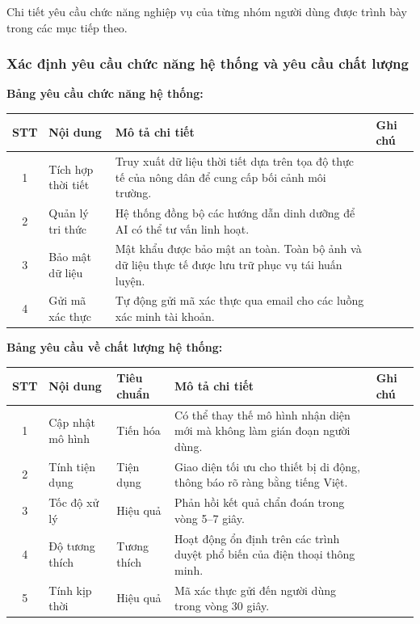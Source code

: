 \documentclass[12pt,a4paper]{article}
\begin{document}
Chi tiết yêu cầu chức năng nghiệp vụ của từng nhóm người dùng được trình bày trong các mục tiếp theo.

\subsubsection{Xác định yêu cầu chức năng hệ thống và yêu cầu chất lượng}

\textbf{Bảng yêu cầu chức năng hệ thống:}
\begin{longtable}{|c|l|p{9.5cm}|l|}
    \hline
    \rowcolor{headerblue}
    \textbf{STT} & \textbf{Nội dung}  & \textbf{Mô tả chi tiết}                                                                            & \textbf{Ghi chú} \\
    \hline
    \endhead
    1            & Tích hợp thời tiết & Truy xuất dữ liệu thời tiết dựa trên tọa độ thực tế của nông dân để cung cấp bối cảnh môi trường.  &                  \\
    \hline
    2            & Quản lý tri thức   & Hệ thống đồng bộ các hướng dẫn dinh dưỡng để AI có thể tư vấn linh hoạt.                           &                  \\
    \hline
    3            & Bảo mật dữ liệu    & Mật khẩu được bảo mật an toàn. Toàn bộ ảnh và dữ liệu thực tế được lưu trữ phục vụ tái huấn luyện. &                  \\
    \hline
    4            & Gửi mã xác thực    & Tự động gửi mã xác thực qua email cho các luồng xác minh tài khoản.                                &                  \\
    \hline
\end{longtable}

\textbf{Bảng yêu cầu về chất lượng hệ thống:}
\begin{longtable}{|c|l|l|p{6.5cm}|l|}
    \hline
    \rowcolor{headerblue}
    \textbf{STT} & \textbf{Nội dung} & \textbf{Tiêu chuẩn} & \textbf{Mô tả chi tiết}                                                    & \textbf{Ghi chú} \\
    \hline
    \endhead
    1            & Cập nhật mô hình  & Tiến hóa            & Có thể thay thế mô hình nhận diện mới mà không làm gián đoạn người dùng.   &                  \\
    \hline
    2            & Tính tiện dụng    & Tiện dụng           & Giao diện tối ưu cho thiết bị di động, thông báo rõ ràng bằng tiếng Việt.  &                  \\
    \hline
    3            & Tốc độ xử lý      & Hiệu quả            & Phản hồi kết quả chẩn đoán trong vòng 5--7 giây.                           &                  \\
    \hline
    4            & Độ tương thích    & Tương thích         & Hoạt động ổn định trên các trình duyệt phổ biến của điện thoại thông minh. &                  \\
    \hline
    5            & Tính kịp thời     & Hiệu quả            & Mã xác thực gửi đến người dùng trong vòng 30 giây.                         &                  \\
    \hline
\end{longtable}
\end{document}
